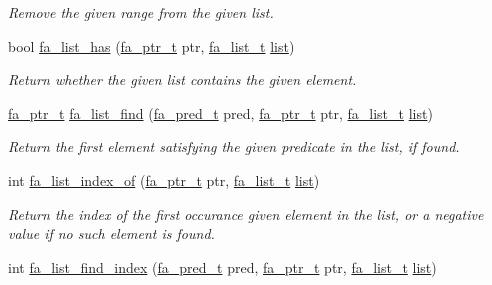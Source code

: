 \begin{DoxyCompactItemize}
\begin{DoxyCompactList}\small\item\em Remove the given range from the given list. \end{DoxyCompactList}\item 
bool \hyperlink{group___fa_list_gaad1e12d92d3966813ac027a2384551e2}{fa\-\_\-list\-\_\-has} (\hyperlink{group___fa_ga915ddeae99ad7568b273d2b876425197}{fa\-\_\-ptr\-\_\-t} ptr, \hyperlink{group___fa_list_ga35ecb12ab934ded0cce0bcf28e3bc5d2}{fa\-\_\-list\-\_\-t} \hyperlink{literals_8h_a4ddd63dfcfec2b4d5741a56aa6003c76}{list})
\begin{DoxyCompactList}\small\item\em Return whether the given list contains the given element. \end{DoxyCompactList}\item 
\hyperlink{group___fa_ga915ddeae99ad7568b273d2b876425197}{fa\-\_\-ptr\-\_\-t} \hyperlink{group___fa_list_gad81ba8575ad24c4b240fa07ff4235d63}{fa\-\_\-list\-\_\-find} (\hyperlink{group___fa_gae6b6ae9fb073db0ba0bd323d511c6a98}{fa\-\_\-pred\-\_\-t} pred, \hyperlink{group___fa_ga915ddeae99ad7568b273d2b876425197}{fa\-\_\-ptr\-\_\-t} ptr, \hyperlink{group___fa_list_ga35ecb12ab934ded0cce0bcf28e3bc5d2}{fa\-\_\-list\-\_\-t} \hyperlink{literals_8h_a4ddd63dfcfec2b4d5741a56aa6003c76}{list})
\begin{DoxyCompactList}\small\item\em Return the first element satisfying the given predicate in the list, if found. \end{DoxyCompactList}\item 
int \hyperlink{group___fa_list_ga79ed6e493ad5865c65e42caa98ca3060}{fa\-\_\-list\-\_\-index\-\_\-of} (\hyperlink{group___fa_ga915ddeae99ad7568b273d2b876425197}{fa\-\_\-ptr\-\_\-t} ptr, \hyperlink{group___fa_list_ga35ecb12ab934ded0cce0bcf28e3bc5d2}{fa\-\_\-list\-\_\-t} \hyperlink{literals_8h_a4ddd63dfcfec2b4d5741a56aa6003c76}{list})
\begin{DoxyCompactList}\small\item\em Return the index of the first occurance given element in the list, or a negative value if no such element is found. \end{DoxyCompactList}\item 
int \hyperlink{group___fa_list_ga9d4dc05192db05c306fc0a3826791f86}{fa\-\_\-list\-\_\-find\-\_\-index} (\hyperlink{group___fa_gae6b6ae9fb073db0ba0bd323d511c6a98}{fa\-\_\-pred\-\_\-t} pred, \hyperlink{group___fa_ga915ddeae99ad7568b273d2b876425197}{fa\-\_\-ptr\-\_\-t} ptr, \hyperlink{group___fa_list_ga35ecb12ab934ded0cce0bcf28e3bc5d2}{fa\-\_\-list\-\_\-t} \hyperlink{literals_8h_a4ddd63dfcfec2b4d5741a56aa6003c76}{list})

\end{DoxyCompactItemize}
